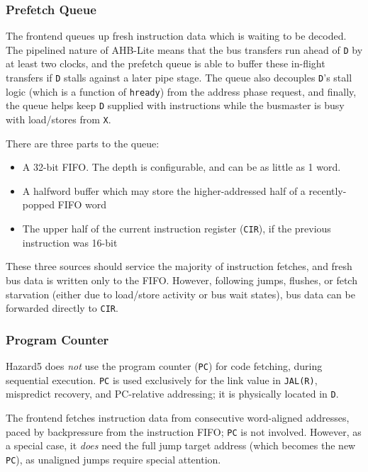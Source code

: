 \documentclass[notitlepage]{article}
\begin{document}
\subsubsection{Prefetch Queue}

The frontend queues up fresh instruction data which is waiting to be decoded. The pipelined nature of AHB-Lite means that the bus transfers run ahead of {\tt D} by at least two clocks, and the prefetch queue is able to buffer these in-flight transfers if {\tt D} stalls against a later pipe stage. The queue also decouples {\tt D}'s stall logic (which is a function of {\tt hready}) from the address phase request, and finally, the queue helps keep {\tt D} supplied with instructions while the busmaster is busy with load/stores from {\tt X}.

There are three parts to the queue:

\begin{itemize}
	\item A 32-bit FIFO. The depth is configurable, and can be as little as 1 word.
	\item A halfword buffer which may store the higher-addressed half of a recently-popped FIFO word
	\item The upper half of the current instruction register ({\tt CIR}), if the previous instruction was 16-bit
\end{itemize}

These three sources should service the majority of instruction fetches, and fresh bus data is written only to the FIFO. However, following jumps, flushes, or fetch starvation (either due to load/store activity or bus wait states), bus data can be forwarded directly to {\tt CIR}.

\subsubsection{Program Counter}

Hazard5 does {\it not} use the program counter ({\tt PC}) for code fetching, during sequential execution. {\tt PC} is used exclusively for the link value in {\tt JAL(R)}, mispredict recovery, and PC-relative addressing; it is physically located in {\tt D}.

The frontend fetches instruction data from consecutive word-aligned addresses, paced by backpressure from the instruction FIFO; {\tt PC} is not involved. However, as a special case, it {\it does} need the full jump target address (which becomes the new {\tt PC}), as unaligned jumps require special attention.
\end{document}
